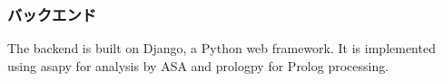 \begin{description}

\end{description}





\subsubsection{バックエンド}
The backend is built on Django, a Python web framework. It is implemented using asapy for analysis by ASA and prologpy for Prolog processing.

